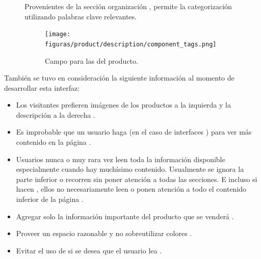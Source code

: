 \begin{description}
			\item [\tagsForm]
				Provenientes de la sección organización , permite la categorización utilizando palabras clave relevantes.

				\begin{figure}[H]
					\centering
					\texttt{[image: figuras/product/description/component\_tags.png]}

					\caption{Campo para las \tagsForm del producto.}
					\label{figure:product:description:component_tags}
				\end{figure}
				
		\end{description}

		También se tuvo en consideración la siguiente información al momento de desarrollar esta interfaz:

		\begin{itemize}
			\item Los visitantes prefieren imágenes de los productos a la izquierda y la descripción a la derecha \cite{online_cxpartners_official_people_see_to_buy}.
			\item Es improbable que un usuario haga \scrollCPT(en el caso de interfaces \desktop) para ver más contenido en la página \cite{online_cxpartners_official_people_see_to_buy}.
			\item Usuarios nunca o muy rara vez leen toda la información disponible especialmente cuando hay muchísimo contenido. Usualmente se ignora la parte inferior o recorren sin poner atención a todas las secciones. E incluso si hacen \scrollCPT, ellos no necesariamente leen o ponen atención a todo el contenido inferior de la página \cite{online_cxpartners_official_people_see_to_buy}.
			\item Agregar solo la información importante del producto que se venderá \cite{online_cxpartners_official_people_see_to_buy}.

			\item Proveer un espacio razonable y no sobreutilizar colores \cite{online_cxpartners_official_people_see_to_buy}.

			\item Evitar el uso de \clicking si se desea que el usuario lea \cite{online_cxpartners_official_people_see_to_buy}.
		\end{itemize}


